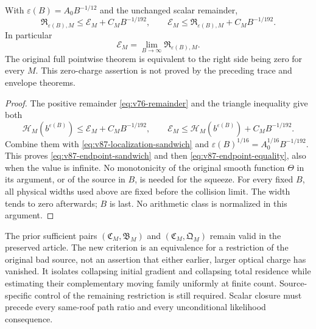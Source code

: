 \begin{theorem}
\label{thm:v87-endpoint}
With $\varepsilon(B)=A_0B^{-1/12}$ and the unchanged scalar remainder,
\begin{equation}\label{eq:v87-endpoint-sandwich}
 \mathfrak R_{\varepsilon(B),M}\le\mathcal E_M+C_MB^{-1/192},\qquad
 \mathcal E_M\le\mathfrak R_{\varepsilon(B),M}+C_MB^{-1/192}.
\end{equation}
In particular
\begin{equation}\label{eq:v87-endpoint-equality}
             \mathcal E_M=\lim_{B\to\infty}\mathfrak R_{\varepsilon(B),M}.
\end{equation}
The original full pointwise theorem is equivalent to the right side
being zero for every $M$. This zero-charge assertion is not proved
by the preceding trace and envelope theorems.
\end{theorem}
\begin{proof}
The positive remainder \eqref{eq:v76-remainder} and the triangle
inequality give both
\[
 \mathcal H_M(b^{\varepsilon(B)})\le\mathcal E_M+C_MB^{-1/192},
 \qquad
 \mathcal E_M\le\mathcal H_M(b^{\varepsilon(B)})+C_MB^{-1/192}.
\]
Combine them with \eqref{eq:v87-localization-sandwich} and
$\varepsilon(B)^{1/16}=A_0^{1/16}B^{-1/192}$.
This proves \eqref{eq:v87-endpoint-sandwich} and then
\eqref{eq:v87-endpoint-equality}, also when the value is infinite.
No monotonicity of the original smooth function $\Theta$ in its
argument, or of the source in $B$, is needed for the squeeze.
For every fixed $B$, all physical widths used above are fixed before
the collision limit. The width tends to zero afterwards; $B$ is last.
No arithmetic class is normalized in this argument.
\end{proof}

The prior sufficient pairs $(\mathfrak C_M,\mathfrak B_M)$ and
$(\mathfrak C_M,\mathfrak Q_M)$ remain valid in the preserved article.
The new criterion is an equivalence for a restriction of the original
bad source, not an assertion that either earlier, larger optical charge
has vanished. It isolates collapsing initial gradient and collapsing
total residence while estimating their complementary moving family
uniformly at finite count. Source-specific control of the remaining
restriction is still required. Scalar closure must precede every
same-roof path ratio and every unconditional likelihood consequence.
